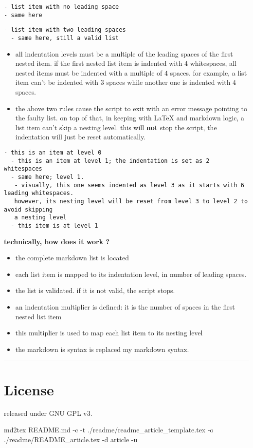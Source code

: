 \documentclass[a4paper, 12pt, twoside]{article}
\begin{document}
\begin{Verbatim}[breaklines=true]
- list item with no leading space
- same here
\end{Verbatim}

\begin{Verbatim}[breaklines=true]
  - list item with two leading spaces
  - same here, still a valid list
\end{Verbatim}

\begin{itemize}
\item all indentation levels must be a multiple of the leading spaces of the first nested item. if the first nested list item is indented with 4 whitespaces, all nested items must be indented with a multiple of 4 spaces. for example, a list item can't be indented with 3 spaces while another one is indented with 4 spaces. 
\end{itemize}

\begin{itemize}
\item the above two rules cause the script to exit with an error message pointing to the faulty list. on top of that, in keeping with LaTeX and markdown logic, a list item can't skip a nesting level. this will \textbf{not} stop the script, the indentation will just be reset automatically. 
\end{itemize}

\begin{Verbatim}[breaklines=true]
- this is an item at level 0
  - this is an item at level 1; the indentation is set as 2 whitespaces
  - same here; level 1.
   - visually, this one seems indented as level 3 as it starts with 6 leading whitespaces.
   however, its nesting level will be reset from level 3 to level 2 to avoid skipping
   a nesting level
  - this item is at level 1
\end{Verbatim}

\textbf{technically, how does it work ?}

\begin{itemize}
\item the complete markdown list is located
\item each list item is mapped to its indentation level, in number of leading spaces.
\item the list is validated. if it is not valid, the script stops.
\item an indentation multiplier is defined: it is the number of spaces in the first nested list item
\item this multiplier is used to map each list item to its nesting level
\item the markdown is syntax is replaced my markdown syntax. 
\end{itemize}

\par\noindent\rule{\linewidth}{0.4pt}
\section*{License}

released under GNU GPL v3.

md2tex README.md -c -t ./readme/readme\_article\_template.tex -o ./readme/README\_article.tex -d article -u


\clearpage
\tableofcontents
\end{document}
